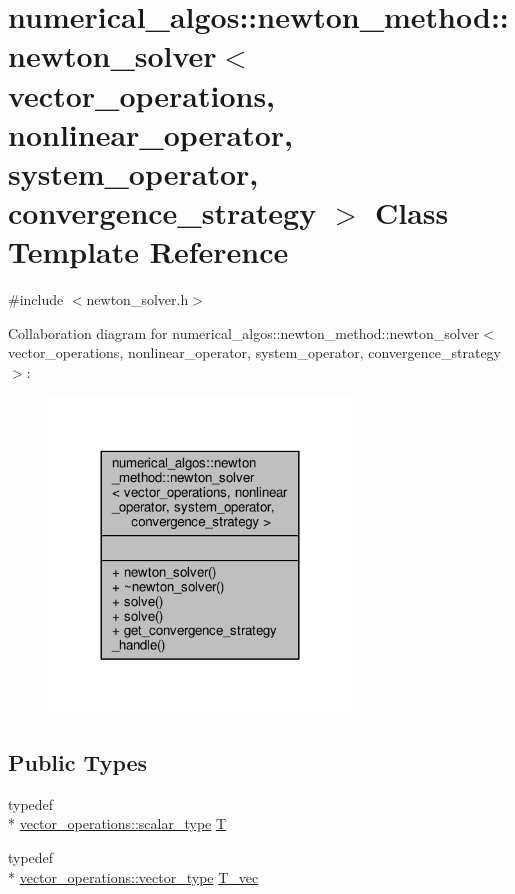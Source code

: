 \hypertarget{classnumerical__algos_1_1newton__method_1_1newton__solver}{\section{numerical\-\_\-algos\-:\-:newton\-\_\-method\-:\-:newton\-\_\-solver$<$ vector\-\_\-operations, nonlinear\-\_\-operator, system\-\_\-operator, convergence\-\_\-strategy $>$ Class Template Reference}
\label{classnumerical__algos_1_1newton__method_1_1newton__solver}
}


{\ttfamily \#include $<$newton\-\_\-solver.\-h$>$}



Collaboration diagram for numerical\-\_\-algos\-:\-:newton\-\_\-method\-:\-:newton\-\_\-solver$<$ vector\-\_\-operations, nonlinear\-\_\-operator, system\-\_\-operator, convergence\-\_\-strategy $>$\-:
\nopagebreak
\begin{figure}[H]
\begin{center}
\leavevmode
\includegraphics[width=228pt]{classnumerical__algos_1_1newton__method_1_1newton__solver__coll__graph}
\end{center}
\end{figure}
\subsection*{Public Types}
\begin{DoxyCompactItemize}
\item 
typedef \\*
\hyperlink{structcpu__vector__operations_aca6b216aa1fb172df83d98350e94fd61}{vector\-\_\-operations\-::scalar\-\_\-type} \hyperlink{classnumerical__algos_1_1newton__method_1_1newton__solver_ad3e4bf5e0eec7f6f103f27378d8b9be7}{T}
\item 
typedef \\*
\hyperlink{structcpu__vector__operations_a1962836df596ce262704d208e9a6d8f9}{vector\-\_\-operations\-::vector\-\_\-type} \hyperlink{classnumerical__algos_1_1newton__method_1_1newton__solver_afc800f3277daaae0e778d366f857b43f}{T\-\_\-vec}
\end{DoxyCompactItemize}
